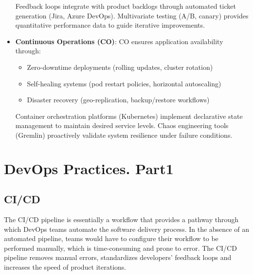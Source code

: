 \documentclass[12pt]{book}
\begin{document}
\begin{itemize}
    Feedback loops integrate with product backlogs through automated ticket generation (Jira, Azure DevOps). Multivariate testing (A/B, canary) provides quantitative performance data to guide iterative improvements.

    \item \textbf{Continuous Operations (CO)}:
    CO ensures application availability through:
    \begin{itemize}
        \item Zero-downtime deployments (rolling updates, cluster rotation)
        \item Self-healing systems (pod restart policies, horizontal autoscaling)
        \item Disaster recovery (geo-replication, backup/restore workflows)
    \end{itemize}

    Container orchestration platforms (Kubernetes) implement declarative state management to maintain desired service levels. Chaos engineering tools (Gremlin) proactively validate system resilience under failure conditions.
\end{itemize}

\section{DevOps Practices. Part1}
\subsection{CI/CD}

The CI/CD pipeline is essentially a workflow that provides a pathway through which DevOps teams automate the software delivery process. 
In the absence of an automated pipeline, teams would have to configure their workflow to be performed manually, which is time-consuming and prone to error. The CI/CD pipeline removes manual errors, standardizes developers' feedback loops and increases the speed of product iterations.
\end{document}
